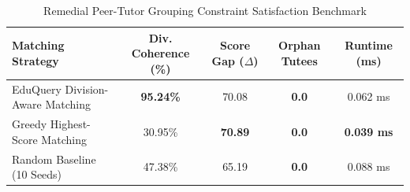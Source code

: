 \begin{table}[h]
\centering
\small
\caption{Remedial Peer-Tutor Grouping Constraint Satisfaction Benchmark}
\label{tab:remedial}
\begin{tabular}{lcccc}
\toprule
\textbf{Matching Strategy} & \textbf{Div. Coherence (\%)} & \textbf{Score Gap ($\Delta$)} & \textbf{Orphan Tutees} & \textbf{Runtime (ms)} \\
\midrule
EduQuery Division-Aware Matching & \textbf{95.24\%} & 70.08 & \textbf{0.0} & 0.062 ms \\
Greedy Highest-Score Matching & 30.95\% & \textbf{70.89} & \textbf{0.0} & \textbf{0.039 ms} \\
Random Baseline (10 Seeds) & 47.38\% & 65.19 & \textbf{0.0} & 0.088 ms \\
\bottomrule
\end{tabular}
\end{table}

